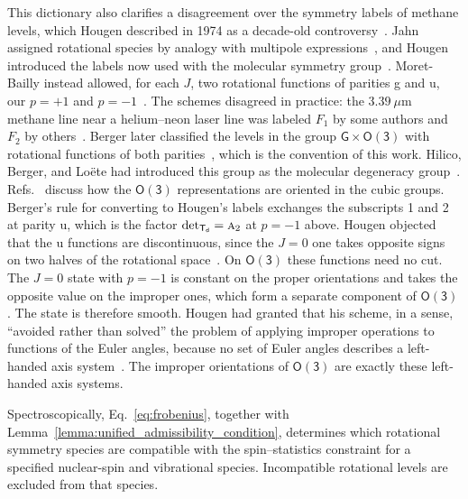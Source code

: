 \documentclass[
  reprint,
  aps,
  prx,
  superscriptaddress,
  amsmath,
  amssymb,
  longbibliography
]{revtex4-2}
\newcommand{\grp}[1]{\mathsf{#1}}
\newcommand{\irr}[1]{\text{\normalfont\scshape #1}}
\newcommand{\parity}{p}               %
\providecommand{\Othree}{\grp{O(3)}}
\begin{document}
This dictionary also clarifies a disagreement over the symmetry labels of methane levels, which Hougen described in 1974 as a decade-old controversy~\cite{Hougen1974, Hougen1976}.
Jahn assigned rotational species by analogy with multipole expressions~\cite{Jahn1938}, and Hougen introduced the labels now used with the molecular symmetry group~\cite{Hougen1962,Hougen1963}.
Moret-Bailly instead allowed, for each $J$, two rotational functions of parities g and u, our $\parity=+1$ and $\parity=-1$~\cite{MoretBailly1974}.
The schemes disagreed in practice: the $3.39\ \mu\mathrm{m}$ methane line near a helium--neon laser line was labeled $F_1$ by some authors and $F_2$ by others~\cite{MoretBailly1974}.
Berger later classified the levels in the group $\grp{G}\times\Othree$ with rotational functions of both parities~\cite{Berger1977}, which is the convention of this work. Hilico, Berger, and Lo\"ete had introduced this group as the molecular degeneracy group~\cite{HilicoBergerLoete1976}. Refs.~\cite{Rey2003, Michelot2004} discuss how the $\Othree$ representations are oriented in the cubic groups.
Berger's rule for converting to Hougen's labels exchanges the subscripts 1 and 2 at parity u, which is the factor $\det_{\grp{T_{d}}}=\irr{a}_{2}$ at $\parity=-1$ above.
Hougen objected that the u functions are discontinuous, since the $J=0$ one takes opposite signs on two halves of the rotational space~\cite{Hougen1974}.
On $\Othree$ these functions need no cut.
The $J=0$ state with $\parity=-1$ is constant on the proper orientations and takes the opposite value on the improper ones, which form a separate component of $\Othree$.
The state is therefore smooth. Hougen had granted that his scheme, in a sense, ``avoided rather than solved'' the problem of applying improper operations to functions of the Euler angles, because no set of Euler angles describes a left-handed axis system~\cite{Hougen1963}. The improper orientations of $\Othree$ are exactly these left-handed axis systems.

Spectroscopically, Eq.~\eqref{eq:frobenius}, together with Lemma~\ref{lemma:unified_admissibility_condition}, determines which rotational symmetry species are compatible with the spin--statistics constraint for a specified nuclear-spin and vibrational species. Incompatible rotational levels are excluded from that species.
\end{document}
